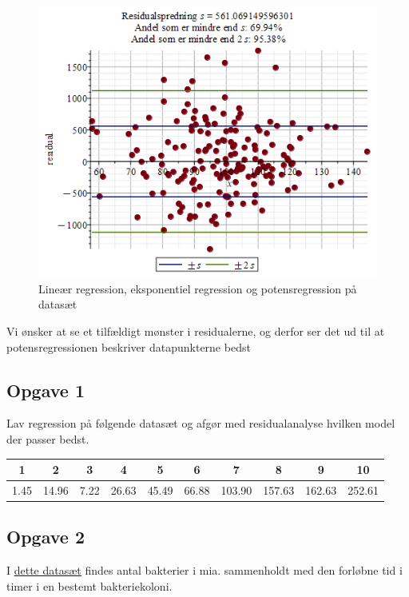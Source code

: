 \begin{exa}
\begin{figure}[H]
\includegraphics[width = \textwidth*4/10]{Billeder/PowRegResidual.png}
\caption{Lineær regression, eksponentiel regression og potensregression på datasæt}
\label{fig:resplot}
\end{figure}
	Vi ønsker at se et tilfældigt mønster i residualerne, og derfor ser det ud til at 
	potensregressionen beskriver datapunkterne bedst
\end{exa}
\subsection*{Opgave 1}

Lav regression på følgende datasæt og afgør med residualanalyse hvilken model der passer bedst.
\begin{center}
\begin{tabular}{c|c|c|c|c|c|c|c|c|c}
1 & 2 & 3 & 4 & 5 & 6 & 7 & 8 & 9 & 10\\ \hline
1.45 & 14.96 & 7.22 & 26.63 & 45.49 & 66.88 & 103.90&157.63 & 162.63 & 252.61
\end{tabular}
\end{center}

\subsection*{Opgave 2}

I \href{https://github.com/ChristianJLex/TeachingNotes/raw/master/2023-2024/Data%20og%20lign/bakterierResidual.xlsx}{\color{blue!60} dette datasæt} findes antal bakterier i mia. sammenholdt med den forløbne tid i timer i en bestemt bakteriekoloni. 

